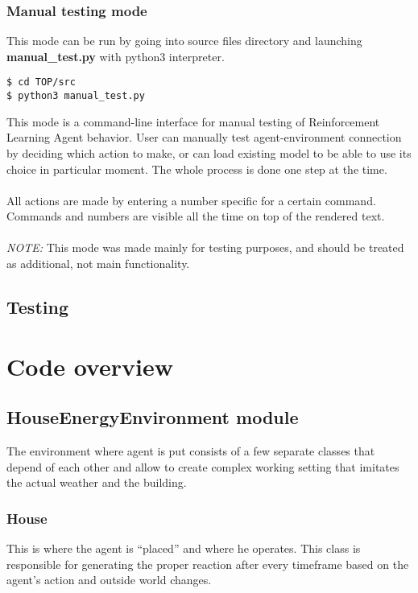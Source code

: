 \documentclass{article}
\begin{document}
\subsubsection{Manual testing mode}
This mode can be run by going into source files directory and launching \textbf{manual\_test.py} with python3 interpreter. 
\begin{lstlisting}
$ cd TOP/src
$ python3 manual_test.py
\end{lstlisting}
This mode is a command-line interface for manual testing of Reinforcement Learning Agent behavior. User can manually test agent-environment connection by deciding which action to make, or can load existing model to be able to use its choice in particular moment. The whole process is done one step at the time.\\\\
All actions are made by entering a number specific for a certain command. Commands and numbers are visible all the time on top of the rendered text. \\\\
\textit{NOTE:} This mode was made mainly for testing purposes, and should be treated as additional, not main functionality.

\subsection{Testing}
\section{Code overview}
\subsection{HouseEnergyEnvironment module}
The environment where agent is put consists of a few separate classes that depend of each other and allow to create complex working setting that imitates the actual weather and the building.
\subsubsection{House}
This is where the agent is “placed” and where he operates. This class is responsible for generating the proper reaction after every timeframe based on the agent’s action and outside world changes.
\end{document}
